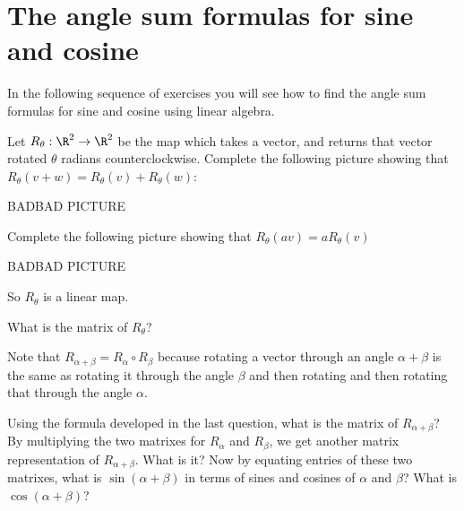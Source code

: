 
\section{The angle sum formulas for sine and cosine}

In the following sequence of exercises you will see how to find the angle sum formulas for sine and cosine using linear algebra.

\begin{question}
	Let $R_\theta : \R^2 \to \R^2$ be the map which takes a vector, and returns that vector rotated $\theta$ radians counterclockwise.
	Complete the following picture showing that $R_\theta(v+w) = R_\theta(v)+R_\theta(w)$:
	
	BADBAD PICTURE
	
	Complete the following picture showing that $R_\theta(av) = aR_\theta(v)$
	
	BADBAD PICTURE
\end{question}

	So $R_\theta$ is a linear map.
	
	\begin{question}
		What is the matrix of $R_\theta$?
	\end{question}
	
	Note that $R_{\alpha+\beta} = R_{\alpha} \circ R_{\beta}$ because rotating a vector through an angle $\alpha +\beta$
	 is the same as rotating it through the angle $\beta$ and then rotating and then rotating that through the angle $\alpha$.
	 
	 \begin{question}
	 	Using the formula developed in the last question, what is the matrix of $R_{\alpha+\beta}$?
	 	By multiplying the two matrixes for $R_\alpha$ and $R_\beta$, we get another matrix representation of $R_{\alpha +\beta}$.  What is it?
	 	Now by equating entries of these two matrixes, what is $\sin(\alpha+\beta)$ in terms of sines and cosines of $\alpha$ and $\beta$?
	 	What is $\cos(\alpha+\beta)$?
	 \end{question}
